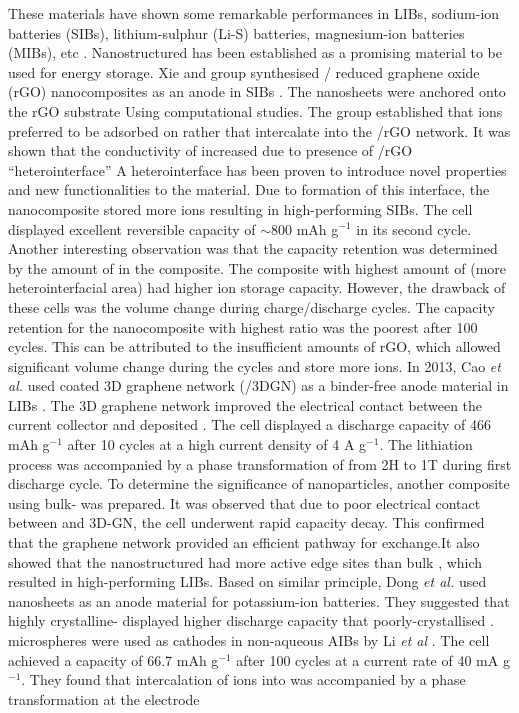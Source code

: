 These materials have shown some remarkable performances in LIBs, sodium-ion batteries (SIBs), lithium-sulphur (Li-S) batteries, magnesium-ion batteries (MIBs), etc \cite{xie_mos2/graphene_2015,cao_preparation_2013,dong_insights_2019,li_rechargeable_2018}. Nanostructured  has been established as a promising material to be used for energy storage. Xie and group synthesised / reduced graphene oxide (rGO) nanocomposites as an anode in SIBs \cite{xie_mos2/graphene_2015}. The  nanosheets were anchored onto the rGO substrate Using computational studies. The group established that  ions preferred to be adsorbed on  rather that intercalate into the /rGO network. It was shown that the conductivity of  increased due to presence of /rGO \enquote{heterointerface} A heterointerface has been proven to introduce novel properties and new functionalities to the material. Due to formation of this interface, the nanocomposite stored more  ions resulting in high-performing SIBs. The cell displayed excellent reversible capacity of $\sim$800 mAh g$^{-1}$ in its second cycle. Another interesting observation was that the capacity retention was determined by the amount of  in the composite. The composite with highest amount of  (more heterointerfacial area) had higher  ion storage capacity. However, the drawback of these cells was the volume change during charge/discharge cycles. The capacity retention for the nanocomposite with highest  ratio was the poorest after 100 cycles. This can be attributed to the insufficient amounts of rGO, which allowed significant volume change during the cycles and store more  ions. In 2013, Cao \textit{et al.} used  coated 3D graphene network (/3DGN) as a binder-free anode material in LIBs \cite{cao_preparation_2013}. The 3D graphene network improved the electrical contact between the current collector and deposited . The cell displayed a discharge capacity of 466 mAh g$^{-1}$ after 10 cycles at a  high current density of 4 A g$^{-1}$. The lithiation process was accompanied by a phase transformation of  from 2H to 1T during first discharge cycle. To determine the significance of  nanoparticles, another composite using bulk- was prepared. It was observed that due to poor electrical contact between  and 3D-GN, the cell underwent rapid capacity decay. This confirmed that the graphene network provided an efficient pathway for  exchange.It also showed that the nanostructured  had more active edge sites than bulk , which resulted in high-performing LIBs. Based on similar principle, Dong \textit{et al.} used  nanosheets as an anode material for potassium-ion batteries. They suggested that highly crystalline- displayed higher discharge capacity that poorly-crystallised  \cite{dong_insights_2019}.  microspheres were used as cathodes in non-aqueous AIBs by Li \textit{et al} \cite{li_rechargeable_2018}. The cell achieved a capacity of 66.7 mAh g$^{-1}$ after 100 cycles at a current rate of 40 mA g$^{-1}$. They found that intercalation of  ions into  was accompanied by a phase transformation at the electrode 